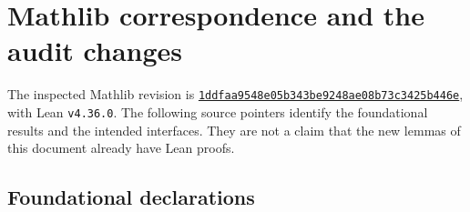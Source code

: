 \documentclass[reqno,a4paper,12pt]{amsart}
\theoremstyle{definition}
\begin{document}
\appendix
\section{Mathlib correspondence and the audit changes}\label{sec:mathlib}
The inspected Mathlib revision is
\href{https://github.com/leanprover-community/mathlib4/tree/1ddfaa9548e05b343be9248ae08b73c3425b446e}{\texttt{1ddfaa9548e05b343be9248ae08b73c3425b446e}},
with Lean \texttt{v4.36.0}. The following source pointers identify the
foundational results and the intended interfaces. They are not a claim
that the new lemmas of this document already have Lean proofs.

\subsection{Foundational declarations}
\begingroup\small\raggedright
\end{document}
